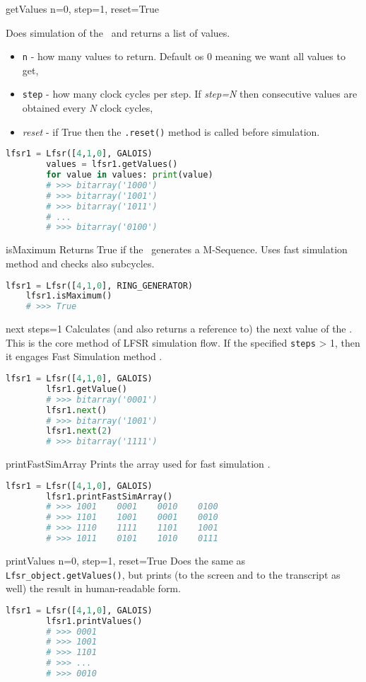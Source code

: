  {getValues} {n=0, step=1, reset=True} {
	Does simulation of the \Lfsr\ and returns a list of values.
	\begin{itemize}
		\item \texttt{n} - how many values to return. Default os 0 meaning we want all values to get,
		\item \texttt{step} - how many clock cycles per step. If \textit{step=N} then consecutive values are obtained every \textit{N} clock cycles,
		\item \textit{reset} - if True then the \texttt{.reset()} method is called before simulation.
	\end{itemize}
}
\begin{lstlisting}[language=Python]
		lfsr1 = Lfsr([4,1,0], GALOIS)
		values = lfsr1.getValues()
		for value in values: print(value)
		# >>> bitarray('1000')
		# >>> bitarray('1001')
		# >>> bitarray('1011')
		# ...
		# >>> bitarray('0100')
\end{lstlisting}


 {isMaximum} {} {
	Returns True if the \Lfsr\ generates a M-Sequence. Uses fast simulation method \cite{lfsr:fastsim} and checks also subcycles.
}
\begin{lstlisting}[language=Python]
	lfsr1 = Lfsr([4,1,0], RING_GENERATOR)
	lfsr1.isMaximum()
	# >>> True
\end{lstlisting}

 {next} {steps=1} {
	Calculates (and also returns a reference to) the next value of the \Lfsr. This is the core method of LFSR simulation flow. If the specified \texttt{steps} > 1, then it engages Fast Simulation method \cite{lfsr:fastsim}. 
}
\begin{lstlisting}[language=Python]
		lfsr1 = Lfsr([4,1,0], GALOIS)
		lfsr1.getValue()
		# >>> bitarray('0001')
		lfsr1.next()
		# >>> bitarray('1001')
		lfsr1.next(2)
		# >>> bitarray('1111')
\end{lstlisting}

 {printFastSimArray} {} {
	Prints the array used for fast simulation \cite{lfsr:fastsim}.
}
\begin{lstlisting}[language=Python]
		lfsr1 = Lfsr([4,1,0], GALOIS)
		lfsr1.printFastSimArray()
		# >>> 1001    0001    0010    0100
		# >>> 1101    1001    0001    0010
		# >>> 1110    1111    1101    1001
		# >>> 1011    0101    1010    0111
\end{lstlisting}

 {printValues} {n=0, step=1, reset=True} {
	Does the same as \texttt{Lfsr\_object.getValues()}, but prints (to the screen and to the transcript as well) the result in human-readable form.
}
\begin{lstlisting}[language=Python]
		lfsr1 = Lfsr([4,1,0], GALOIS)
		lfsr1.printValues()
		# >>> 0001
		# >>> 1001
		# >>> 1101
		# >>> ...
		# >>> 0010
\end{lstlisting}

